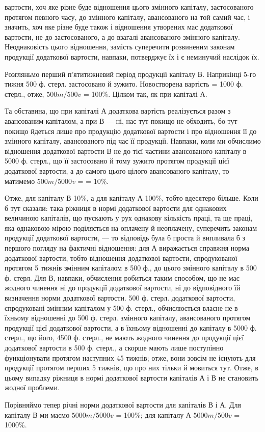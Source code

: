 \parcont{}  %
вартости, хоч яке різне буде відношення цього змінного капіталу, застосованого
протягом певного часу, до змінного капіталу, авансованого на
той самий час, і значить, хоч яке різне буде також і відношення утворених
мас додаткової вартости, не до застосованого, а до взагалі авансованого
змінного капіталу. Неоднаковість цього відношення, замість суперечити
розвиненим законам продукції додаткової вартости, навпаки,
потверджує їх і є неминучий наслідок їх.

Розгляньмо перший п’ятитижневий період продукції капіталу В. Наприкінці
5-го тижня 500 ф. стерл. застосовано й зужито. Новостворена
вартість = 1000 ф. стерл., отже, $500m/500v$ = 100\%. Цілком так, як при капіталі А.

Та обставина, що при капіталі А додаткова вартість реалізується разом з
авансованим капіталом, а при В — ні, нас тут покищо не обходить, бо
тут покищо йдеться лише про продукцію додаткової вартости і про
відношення її до змінного капіталу, авансованого під час її продукції.
Навпаки, коли ми обчислимо відношення додаткової вартости В не
до тієї частини авансованого капіталу в 5000 ф. стерл., що її застосовано й
тому зужито протягом продукції цієї додаткової вартости, а до самого
цього цілого авансованого капіталу, то матимемо $500m/5000v$ =  = 10\%.

Отже, для капіталу В 10\%, а для капіталу А 100\%, тобто вдесятеро
більше. Коли б тут сказали: така ріжниця в нормі додаткової вартости
для однакових величиною капіталів, що пускають у рух однакову кількість
праці, та ще праці, яка однаковою мірою поділяється на оплачену й
неоплачену, суперечить законам продукції додаткової вартости, — то
відповідь була б проста й випливала б з першого погляду на фактичні
відношення: для А виражається справжня норма додаткової вартости,
тобто відношення додаткової вартости, спродукованої протягом 5 тижнів
змінним капіталом в 500 ф., до цього змінного капіталу в 500 ф. стерл.
Для В, навпаки, обчислення робиться таким способом, що не має жодного
чинення ні до продукції додаткової вартости, ні до відповідного їй
визначення норми додаткової вартости. 500 ф. стерл. додаткової вартости,
спродуковані змінним капіталом у 500 ф. стерл., обчислюється
власне не в їхньому відношенні до 500 ф. стерл. змінного капіталу, авансованого
протягом продукції цієї додаткової вартости, а в їхньому відношенні
до капіталу в 5000 ф. стерл., що  його, 4500 ф. стерл., не мають
жодного чинення до продукції цієї додаткової вартости в 500 ф. стерл., а
скорше мають лише поступінно функціонувати протягом наступних 45 тижнів;
отже, вони зовсім не існують для продукції протягом перших 5 тижнів,
що про них тільки й мовиться тут. Отже, в цьому випадку ріжниця
в нормі додаткової вартости капіталів А і В не становить жодної
проблеми.

Порівняймо тепер річні норми додаткової вартости для капіталів В і А.
Для капіталу В ми маємо $5000m/5000v$ = 100\%; для капіталу А $5000m/500v$ = 1000\%.
\parbreak{}  %
